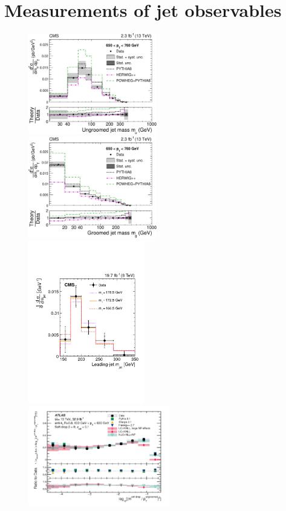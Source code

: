 \section{Measurements of jet observables}
\begin{figure}[t!]
 \includegraphics[width=0.5\textwidth]{figures/CMS_jetmass_ungroomed.pdf} 
 \includegraphics[width=0.5\textwidth]{figures/CMS_SD_jetmass_total.pdf} \\
 \includegraphics[width=0.45\textwidth]{figures/CMS_jetmass_top.pdf} 
 \includegraphics[width=0.55\textwidth]{figures/ATLAS_SD_jetmass.pdf}

\end{figure}

